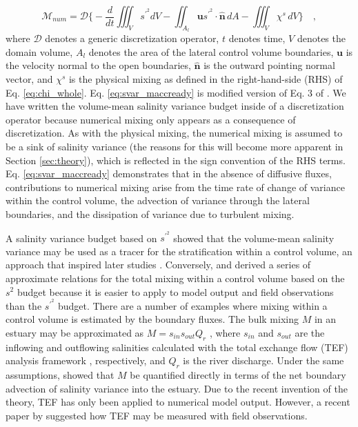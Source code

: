 \begin{equation} \label{eq:svar_maccready}
    \mathcal{M}_{num} = \mathcal{D} \biggl\{-\frac{d}{dt} \iiint_V s^{\prime^2} dV - \iint_{A_l} \mathbf{u}s^{\prime^2} \cdot \hat{\mathbf{n}} \,  dA - \iiint_V \chi^s \, dV \biggl\} \quad ,
\end{equation}
where $\mathcal{D}$ denotes a generic discretization operator, $t$ denotes time, $V$ denotes the domain volume, $A_l$ denotes the area of the lateral control volume boundaries, $\mathbf{u}$ is the velocity normal to the open boundaries, $\hat{\mathbf{n}}$ is the outward pointing normal vector, and $\chi^s$ is the physical mixing as defined in the right-hand-side (RHS) of Eq. \ref{eq:chi_whole}. Eq. \ref{eq:svar_maccready} is modified version of Eq. 3 of \citet{MacCready_2018}. We have written the volume-mean salinity variance budget inside of a discretization operator because numerical mixing only appears as a consequence of discretization. As with the physical mixing, the numerical mixing is assumed to be a sink of salinity variance (the reasons for this will become more apparent in Section \ref{sec:theory}), which is reflected in the sign convention of the RHS terms. Eq. \ref{eq:svar_maccready} demonstrates that in the absence of diffusive fluxes, contributions to numerical mixing arise from the time rate of change of variance within the control volume, the advection of variance through the lateral boundaries, and the dissipation of variance due to turbulent mixing. 

A salinity variance budget based on $s^{\prime^2}$ \citep{Li_2018} showed that the volume-mean salinity variance may be used as a tracer for the stratification within a control volume, an approach that inspired later studies \citep{Broatch_2022, Li_2021, Wang_2018}. Conversely, \citet{Lorenz_2021} and \citet{Burchard_2019} derived a series of approximate relations for the total mixing within a control volume based on the $s^2$ budget because it is easier to apply to model output and field observations than the $s^{\prime^2}$ budget. There are a number of examples where mixing within a control volume is estimated by the boundary fluxes. The bulk mixing $M$ in an estuary may be approximated as $M=s_{in}s_{out}Q_r$ \citep{Burchard_2019, Burchard_2020}, where $s_{in}$ and $s_{out}$ are the inflowing and outflowing salinities calculated with the total exchange flow (TEF) analysis framework \citep{MacCready_2011}, respectively, and $Q_r$ is the river discharge. Under the same assumptions, \citet{Qu_2022_box} showed that $M$ be quantified directly in terms of the net boundary advection of salinity variance into the estuary. Due to the recent invention of the theory, TEF has only been applied to numerical model output. However, a recent paper by \citet{Lemagie_2022} suggested how TEF may be measured with field observations. 

